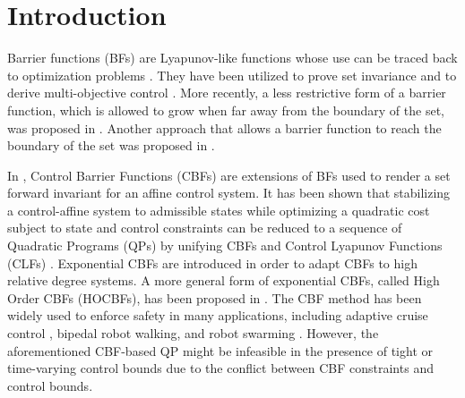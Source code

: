 \section{Introduction}
\label{sec:Introduction}

Barrier functions (BFs) are Lyapunov-like functions \cite{tee2009barrier} whose use can be traced back to optimization problems \cite{boyd2004convex}. They have been utilized to prove set invariance \cite{aubin2011viability} \cite{prajna2007framework} and to derive multi-objective control \cite{panagou2013multi} \cite{wang2016multi}. More recently, a less restrictive form of a barrier function, which is allowed to grow when far away from the boundary of the set, was proposed in \cite{ames2016control}. Another approach that allows
a barrier function to reach the boundary of
the set was proposed in \cite{glotfelter2017nonsmooth}. 

In \cite{boyd2004convex}, Control Barrier Functions (CBFs) are extensions of BFs used to render a set forward invariant for an affine control system. It has been shown that stabilizing a control-affine system to admissible states while optimizing a quadratic cost subject to state and control constraints can be reduced to a sequence of Quadratic Programs (QPs) \cite{ames2016control} by unifying CBFs and Control Lyapunov Functions (CLFs) \cite{ames2012control}. 
Exponential CBFs \cite{nguyen2016exponential} are introduced in order to adapt CBFs to high relative degree systems. A more general form of exponential CBFs, called High Order CBFs (HOCBFs), has been proposed in \cite{xiao2021high}. The CBF method has been widely used to enforce safety in many applications, including adaptive cruise control \cite{ames2016control}, bipedal robot walking, \cite{hsu2015control} and robot swarming \cite{borrmann2015control}. However, the aforementioned CBF-based QP might be infeasible in the presence of tight or time-varying control bounds due to the conflict between CBF constraints and control bounds.

